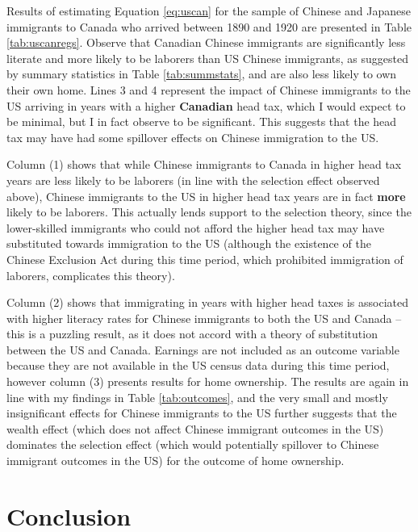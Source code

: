 \documentclass[12pt]{article}
\begin{document}
Results of estimating Equation \ref{eq:uscan} for the sample of Chinese and Japanese immigrants to Canada who arrived between 1890 and 1920 are presented in Table \ref{tab:uscanregs}. Observe that Canadian Chinese immigrants are significantly less literate and more likely to be laborers than US Chinese immigrants, as suggested by summary statistics in Table \ref{tab:summstats}, and are also less likely to own their own home. Lines 3 and 4 represent the impact of Chinese immigrants to the US arriving in years with a higher \textbf{Canadian} head tax, which I would expect to be minimal, but I in fact observe to be significant. This suggests that the head tax may have had some spillover effects on Chinese immigration to the US. 

Column (1) shows that while Chinese immigrants to Canada in higher head tax years are less likely to be laborers (in line with the selection effect observed above), Chinese immigrants to the US in higher head tax years are in fact \textbf{more} likely to be laborers. This actually lends support to the selection theory, since the lower-skilled immigrants who could not afford the higher head tax may have substituted towards immigration to the US (although the existence of the Chinese Exclusion Act during this time period, which prohibited immigration of laborers, complicates this theory). 

Column (2) shows that immigrating in years with higher head taxes is associated with higher literacy rates for Chinese immigrants to both the US and Canada -- this is a puzzling result, as it does not accord with a theory of substitution between the US and Canada. Earnings are not included as an outcome variable because they are not available in the US census data during this time period, however column (3) presents results for home ownership. The results are again in line with my findings in Table \ref{tab:outcomes}, and the very small and mostly insignificant effects for Chinese immigrants to the US further suggests that the wealth effect (which does not affect Chinese immigrant outcomes in the US) dominates the selection effect (which would potentially spillover to Chinese immigrant outcomes in the US) for the outcome of home ownership.

\section{Conclusion}
\end{document}
